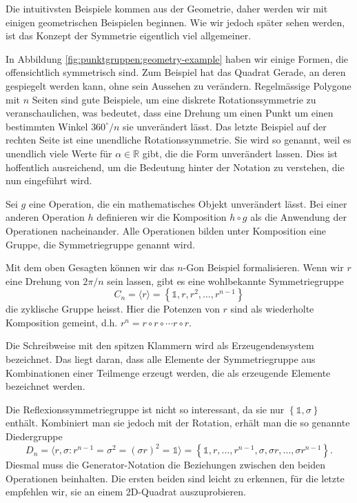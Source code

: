 Die intuitivsten Beispiele kommen aus der Geometrie, daher werden wir mit
einigen geometrischen Beispielen beginnen. Wie wir jedoch später sehen werden,
ist das Konzept der Symmetrie eigentlich viel allgemeiner.  

In Abbildung \ref{fig:punktgruppen:geometry-example} haben wir einige Formen,
die offensichtlich symmetrisch sind.  Zum Beispiel hat das Quadrat Gerade, an
deren gespiegelt werden kann, ohne sein Aussehen zu verändern.  Regelmässige
Polygone mit \(n\) Seiten sind gute Beispiele, um eine diskrete
Rotationssymmetrie zu veranschaulichen, was bedeutet, dass eine Drehung um
einen Punkt um einen bestimmten Winkel \(360^\circ/n\) sie unverändert lässt.
Das letzte Beispiel auf der rechten Seite ist eine unendliche
Rotationssymmetrie. Sie wird so genannt, weil es unendlich viele Werte für
\(\alpha \in \mathbb{R}\) gibt, die die Form unverändert lassen.  Dies ist
hoffentlich ausreichend, um die Bedeutung hinter der Notation zu verstehen, die
nun eingeführt wird.

\begin{definition}[Symmetriegruppe]
	Sei \(g\) eine Operation, die ein mathematisches Objekt unverändert lässt.
	Bei einer anderen Operation \(h\) definieren wir die Komposition \(h\circ g\)
	als die Anwendung der Operationen nacheinander. Alle Operationen bilden unter
	Komposition eine Gruppe, die Symmetriegruppe genannt wird.
\end{definition}

Mit dem oben Gesagten können wir das \(n\)-Gon Beispiel formalisieren. Wenn wir
\(r\) eine Drehung von \(2\pi/n\) sein lassen, gibt es eine wohlbekannte Symmetriegruppe
\[
	C_n = \langle r \rangle
		= \left\{\mathds{1}, r, r^2, \ldots, r^{n-1}\right\}
\]
die zyklische Gruppe heisst. Hier die Potenzen von \(r\) sind als wiederholte
Komposition gemeint, d.h. \(r^n = r\circ r \circ \cdots r\circ r\).

Die Schreibweise mit den spitzen Klammern wird als Erzeugendensystem bezeichnet.
Das liegt daran, dass alle Elemente der Symmetriegruppe aus Kombinationen einer
Teilmenge erzeugt werden, die als erzeugende Elemente bezeichnet werden. 

Die Reflexionssymmetriegruppe ist nicht so interessant, da sie nur
\(\left\{\mathds{1}, \sigma\right\}\) enthält. Kombiniert man sie jedoch mit
der Rotation, erhält man die so genannte Diedergruppe
\[
	D_n = \langle r, \sigma : r^{n-1} = \sigma^2 = (\sigma r)^2 = \mathds{1} \rangle
		= \left\{
				\mathds{1}, r, \ldots, r^{n-1}, \sigma, \sigma r, \ldots, \sigma r^{n-1}
		\right\}.
\]
Diesmal muss die Generator-Notation die Beziehungen zwischen den beiden
Operationen beinhalten. Die ersten beiden sind leicht zu erkennen, für die
letzte empfehlen wir, sie an einem 2D-Quadrat auszuprobieren.

